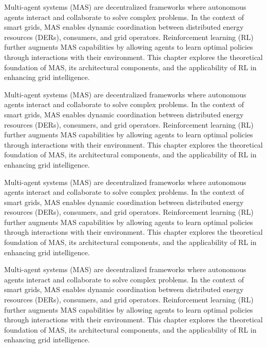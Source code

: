 Multi-agent systems (MAS) are decentralized frameworks where autonomous agents interact and collaborate to solve complex problems. 
In the context of smart grids, MAS enables dynamic coordination between distributed energy resources (DERs), consumers, and grid operators. 
Reinforcement learning (RL) further augments MAS capabilities by allowing agents to learn optimal policies through interactions with their environment. 
This chapter explores the theoretical foundation of MAS, its architectural components, and the applicability of RL in enhancing grid intelligence.

Multi-agent systems (MAS) are decentralized frameworks where autonomous agents interact and collaborate to solve complex problems. 
In the context of smart grids, MAS enables dynamic coordination between distributed energy resources (DERs), consumers, and grid operators. 
Reinforcement learning (RL) further augments MAS capabilities by allowing agents to learn optimal policies through interactions with their environment. 
This chapter explores the theoretical foundation of MAS, its architectural components, and the applicability of RL in enhancing grid intelligence.

Multi-agent systems (MAS) are decentralized frameworks where autonomous agents interact and collaborate to solve complex problems. 
In the context of smart grids, MAS enables dynamic coordination between distributed energy resources (DERs), consumers, and grid operators. 
Reinforcement learning (RL) further augments MAS capabilities by allowing agents to learn optimal policies through interactions with their environment. 
This chapter explores the theoretical foundation of MAS, its architectural components, and the applicability of RL in enhancing grid intelligence.

Multi-agent systems (MAS) are decentralized frameworks where autonomous agents interact and collaborate to solve complex problems. 
In the context of smart grids, MAS enables dynamic coordination between distributed energy resources (DERs), consumers, and grid operators. 
Reinforcement learning (RL) further augments MAS capabilities by allowing agents to learn optimal policies through interactions with their environment. 
This chapter explores the theoretical foundation of MAS, its architectural components, and the applicability of RL in enhancing grid intelligence.

